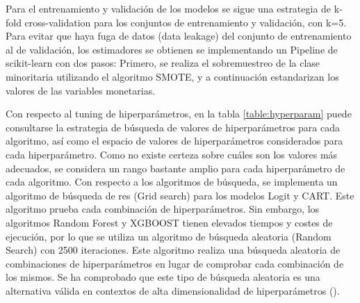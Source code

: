 Para el entrenamiento y validación de los modelos se sigue una estrategia de k-fold cross-validation para los conjuntos de entrenamiento y validación, con k=5. Para evitar que haya fuga de datos (data leakage) del conjunto de entrenamiento al de validación, los estimadores se obtienen se implementando un Pipeline de scikit-learn con dos pasos: Primero, se realiza el sobremuestreo de la clase minoritaria utilizando el algoritmo SMOTE, y a continuación estandarizan los valores de las variables monetarias.

Con respecto al tuning de hiperparámetros, en la tabla \ref{table:hyperparam} puede consultarse la estrategia de búsqueda de valores de hiperparámetros para cada algoritmo, así como el espacio de valores de hiperparámetros considerados para cada hiperparámetro. Como no existe certeza sobre cuáles son los valores más adecuados, se considera un rango bastante amplio para cada hiperparámetro de cada algoritmo. Con respecto a los algoritmos de búsqueda, se implementa un algoritmo de búsqueda de res (Grid search) para los modelos Logit y CART. Este algoritmo prueba cada combinación de hiperparámetros. Sin embargo, los algoritmos Random Forest y XGBOOST tienen elevados tiempos y costes de ejecución, por lo que se utiliza un algoritmo de búsqueda aleatoria (Random Search) con 2500 iteraciones. Este algoritmo realiza una búsqueda aleatoria de combinaciones de hiperparámetros en lugar de comprobar cada combinación de los mismos. Se ha comprobado que este tipo de búsqueda aleatoria es una alternativa válida en contextos de alta dimensionalidad de hiperparámetros (\cite{bergstra2012random}).

